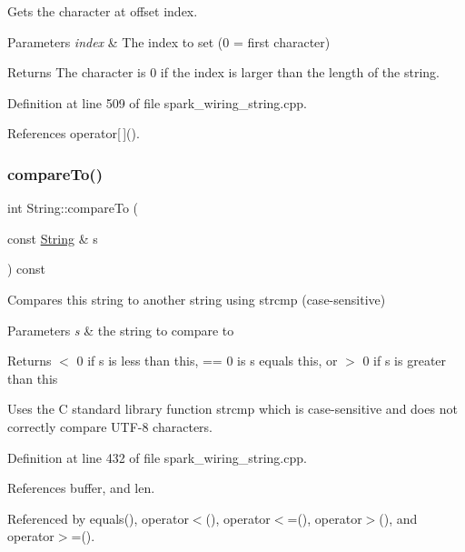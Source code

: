 Gets the character at offset index. 


\begin{DoxyParams}{Parameters}
{\em index} & The index to set (0 = first character)\\
\hline
\end{DoxyParams}
\begin{DoxyReturn}{Returns}
The character is 0 if the index is larger than the length of the string. 
\end{DoxyReturn}


Definition at line 509 of file spark\+\_\+wiring\+\_\+string.\+cpp.



References operator\mbox{[}$\,$\mbox{]}().

\mbox{\label{class_string_ab95c64acc3d5105efdc9709a4cc31e76}} 
\subsubsection{\texorpdfstring{compare\+To()}{compareTo()}}
{\footnotesize\ttfamily int String\+::compare\+To (\begin{DoxyParamCaption}\item[{const \hyperlink{class_string}{String} \&}]{s }\end{DoxyParamCaption}) const}



Compares this string to another string using strcmp (case-\/sensitive) 


\begin{DoxyParams}{Parameters}
{\em s} & the string to compare to\\
\hline
\end{DoxyParams}
\begin{DoxyReturn}{Returns}
$<$ 0 if s is less than this, == 0 is s equals this, or $>$ 0 if s is greater than this
\end{DoxyReturn}
Uses the C standard library function strcmp which is case-\/sensitive and does not correctly compare U\+T\+F-\/8 characters. 

Definition at line 432 of file spark\+\_\+wiring\+\_\+string.\+cpp.



References buffer, and len.



Referenced by equals(), operator$<$(), operator$<$=(), operator$>$(), and operator$>$=().

